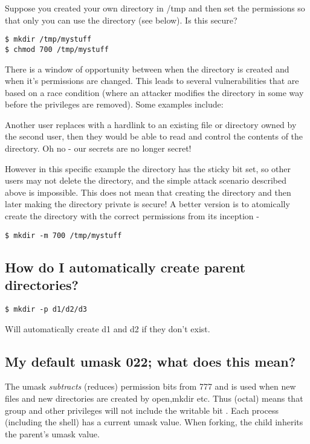Suppose you created your own directory in /tmp and then set the permissions so that only you can use the directory (see below). Is this secure?

\begin{lstlisting}
$ mkdir /tmp/mystuff
$ chmod 700 /tmp/mystuff
\end{lstlisting}

There is a window of opportunity between when the directory is created and when it's permissions are changed. This leads to several vulnerabilities that are based on a race condition (where an attacker modifies the directory in some way before the privileges are removed). Some examples include:

Another user replaces  with a hardlink to an existing file or directory owned by the second user, then they would be able to read and control the contents of the  directory. Oh no - our secrets are no longer secret!

However in this specific example the  directory has the sticky bit set, so other users may not delete the  directory, and the simple attack scenario described above is impossible. This does not mean that creating the directory and then later making the directory private is secure! A better version is to atomically create the directory with the correct permissions from its inception -

\begin{lstlisting}
$ mkdir -m 700 /tmp/mystuff
\end{lstlisting}

\subsection{How do I automatically create parent directories?}\label{how-do-i-automatically-create-parent-directories}

\begin{lstlisting}
$ mkdir -p d1/d2/d3
\end{lstlisting}

Will automatically create d1 and d2 if they don't exist.

\subsection{My default umask 022; what does this mean?}\label{my-default-umask-022-what-does-this-mean}

The umask \emph{subtracts} (reduces) permission bits from 777 and is used when new files and new directories are created by open,mkdir etc. Thus  (octal) means that group and other privileges will not include the writable bit . Each process (including the shell) has a current umask value. When forking, the child inherits the parent's umask value.

